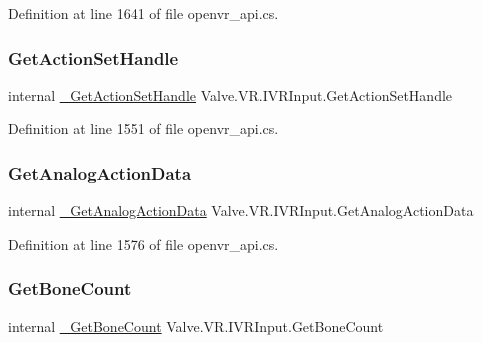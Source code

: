 Definition at line 1641 of file openvr\+\_\+api.\+cs.

\mbox{\label{struct_valve_1_1_v_r_1_1_i_v_r_input_a3a9b1c169571d3460bca2ac31de90d4a}} 
\subsubsection{\texorpdfstring{GetActionSetHandle}{GetActionSetHandle}}
{\footnotesize\ttfamily internal \mbox{\hyperlink{struct_valve_1_1_v_r_1_1_i_v_r_input_ab3c6223a018a82a60946167267376579}{\+\_\+\+Get\+Action\+Set\+Handle}} Valve.\+V\+R.\+I\+V\+R\+Input.\+Get\+Action\+Set\+Handle}



Definition at line 1551 of file openvr\+\_\+api.\+cs.

\mbox{\label{struct_valve_1_1_v_r_1_1_i_v_r_input_abfadd0b1ea3647fa3484a0bb65aa4e82}} 
\subsubsection{\texorpdfstring{GetAnalogActionData}{GetAnalogActionData}}
{\footnotesize\ttfamily internal \mbox{\hyperlink{struct_valve_1_1_v_r_1_1_i_v_r_input_a3e6eea8d879b201cac5deced936b5298}{\+\_\+\+Get\+Analog\+Action\+Data}} Valve.\+V\+R.\+I\+V\+R\+Input.\+Get\+Analog\+Action\+Data}



Definition at line 1576 of file openvr\+\_\+api.\+cs.

\mbox{\label{struct_valve_1_1_v_r_1_1_i_v_r_input_a0b5ff4370a510db94339ade7e82cb2c8}} 
\subsubsection{\texorpdfstring{GetBoneCount}{GetBoneCount}}
{\footnotesize\ttfamily internal \mbox{\hyperlink{struct_valve_1_1_v_r_1_1_i_v_r_input_a45156426324aa529ba4317faa0ddbded}{\+\_\+\+Get\+Bone\+Count}} Valve.\+V\+R.\+I\+V\+R\+Input.\+Get\+Bone\+Count}



